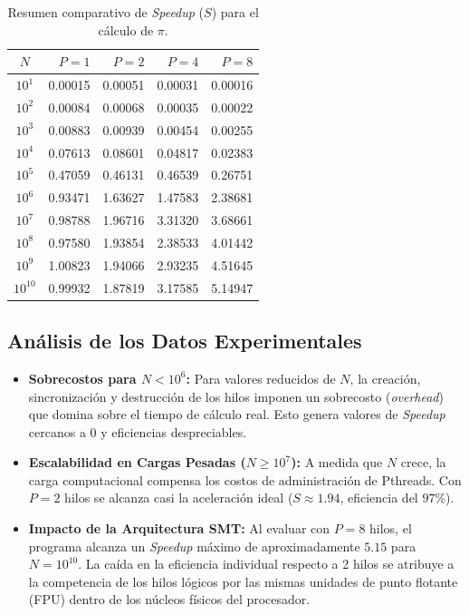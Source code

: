 \documentclass[11pt,a4paper]{article}
\begin{document}
\begin{table}[H]
\centering
\caption{Resumen comparativo de \textit{Speedup} ($S$) para el cálculo de $\pi$.}
\label{tab:resumen_speedup_pi}
\renewcommand{\arraystretch}{1.35}
\begin{tabular}{crrrr}
\hline
\textbf{$N$} & \textbf{$P = 1$} & \textbf{$P = 2$} & \textbf{$P = 4$} & \textbf{$P = 8$} \\ \hline
$10^1$   & 0.00015 & 0.00051 & 0.00031 & 0.00016 \\
$10^2$   & 0.00084 & 0.00068 & 0.00035 & 0.00022 \\
$10^3$   & 0.00883 & 0.00939 & 0.00454 & 0.00255 \\
$10^4$   & 0.07613 & 0.08601 & 0.04817 & 0.02383 \\
$10^5$   & 0.47059 & 0.46131 & 0.46539 & 0.26751 \\
$10^6$   & 0.93471 & 1.63627 & 1.47583 & 2.38681 \\
$10^7$   & 0.98788 & 1.96716 & 3.31320 & 3.68661 \\
$10^8$   & 0.97580 & 1.93854 & 2.38533 & 4.01442 \\
$10^9$   & 1.00823 & 1.94066 & 2.93235 & 4.51645 \\
$10^{10}$ & 0.99932 & 1.87819 & 3.17585 & 5.14947 \\ \hline
\end{tabular}
\end{table}

\subsection{Análisis de los Datos Experimentales}
\begin{itemize}
    \item \textbf{Sobrecostos para $N < 10^6$:} Para valores reducidos de $N$, la creación, sincronización y destrucción de los hilos imponen un sobrecosto (\textit{overhead}) que domina sobre el tiempo de cálculo real. Esto genera valores de \textit{Speedup} cercanos a 0 y eficiencias despreciables.
    \item \textbf{Escalabilidad en Cargas Pesadas ($N \ge 10^7$):} A medida que $N$ crece, la carga computacional compensa los costos de administración de Pthreads. Con $P=2$ hilos se alcanza casi la aceleración ideal ($S \approx 1.94$, eficiencia del $97\%$).
    \item \textbf{Impacto de la Arquitectura SMT:} Al evaluar con $P=8$ hilos, el programa alcanza un \textit{Speedup} máximo de aproximadamente $5.15$ para $N = 10^{10}$. La caída en la eficiencia individual respecto a 2 hilos se atribuye a la competencia de los hilos lógicos por las mismas unidades de punto flotante (FPU) dentro de los núcleos físicos del procesador.
\end{itemize}
\end{document}
